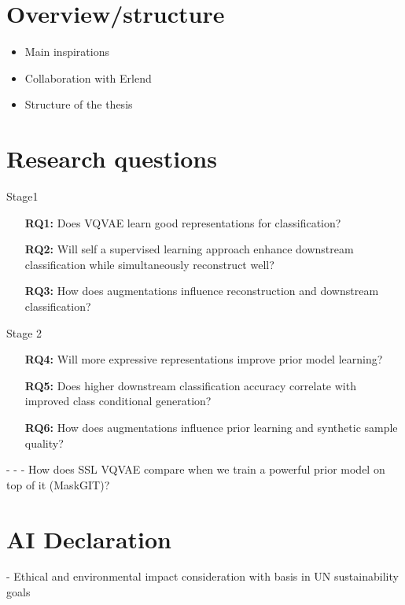 \documentclass[../../thesis.tex]{subfiles}
\begin{document}
\section{Overview/structure}
\begin{itemize}
	\item Main inspirations
	\cite{TimeVQVAE} 
	\item Collaboration with Erlend
	\item Structure of the thesis
\end{itemize}
\section{Research questions}
Stage1
\begin{itemize}
	\item[\textbf{RQ1:}] Does VQVAE learn good representations for classification?
	\item[\textbf{RQ2:}] Will self a supervised learning approach enhance downstream classification while simultaneously reconstruct well?
	\item[\textbf{RQ3:}] How does augmentations influence reconstruction and downstream classification? 
\end{itemize}
Stage 2
\begin{itemize}
	\item[\textbf{RQ4:}] Will more expressive representations improve prior model learning?
	\item[\textbf{RQ5:}] Does higher downstream classification accuracy correlate with improved class conditional generation?
	\item[\textbf{RQ6:}] How does augmentations influence prior learning and synthetic sample quality?
\end{itemize}

		-  
	- 
	- How does SSL VQVAE compare when we train a powerful prior model on top of it (MaskGIT)? 



\section{AI Declaration}

- Ethical and environmental impact consideration with basis in UN sustainability goals
\end{document}
